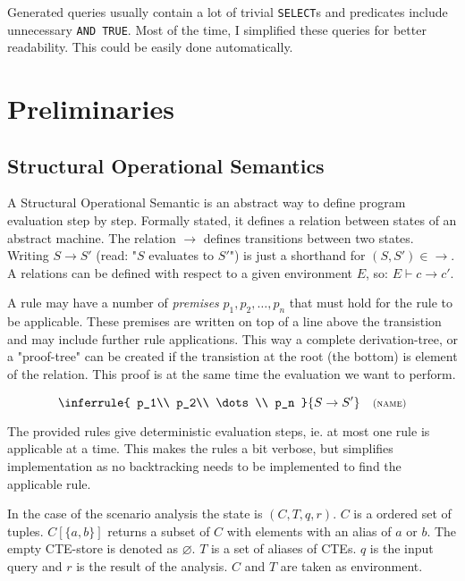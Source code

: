 Generated queries usually contain a lot of trivial \texttt{SELECT}s and predicates include unnecessary \texttt{AND TRUE}. Most of the time, I simplified these queries for better readability. This could be easily done automatically.

\section{Preliminaries}\label{approach}

\subsection{Structural Operational Semantics}

A Structural Operational Semantic is an abstract way to define program evaluation step by step. Formally stated, it defines a relation between states of an abstract machine. The relation $\rightarrow$ defines transitions between two states. Writing $S \rightarrow S'$ (read: "$S$ evaluates to $S'$") is just a shorthand for $(S, S') \in \rightarrow$. A relations can be defined with respect to a given environment $E$, so: $E \vdash c \rightarrow c'$. \cite[Ch. 2]{semanticsWithApplications}

A rule may have a number of \textit{premises} $p_1, p_2, \dots, p_n$ that must hold for the rule to be applicable. These premises are written on top of a line above the transistion and may include further rule applications. This way a complete derivation-tree, or a "proof-tree" can be created if the transistion at the root (the bottom) is element of the relation. This proof is at the same time the evaluation we want to perform.

$$\inferrule{
   p_1\\
   p_2\\
   \dots\\
   p_n
}{
    S \rightarrow S'
}\quad\footnotesize{\textsc{(name)}}$$

The provided rules give deterministic evaluation steps, ie. at most one rule is applicable at a time. This makes the rules a bit verbose, but simplifies implementation as no backtracking needs to be implemented to find the applicable rule.

In the case of the scenario analysis the state is $(C, T, q, r)$. $C$ is a ordered set of tuples. $C[\{a, b\}]$ returns a subset of $C$ with elements with an alias of $a$ or $b$. The empty CTE-store is denoted as $\varnothing$. $T$ is a set of aliases of CTEs. $q$ is the input query and $r$ is the result of the analysis. $C$ and $T$ are taken as environment.

